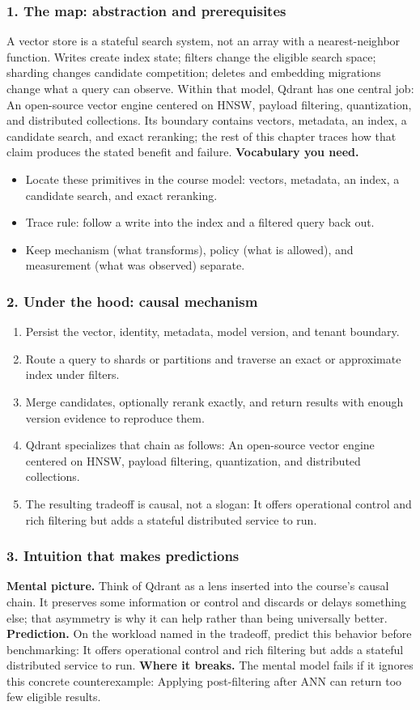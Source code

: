 \subsubsection*{1. The map: abstraction and prerequisites}
A vector store is a stateful search system, not an array with a nearest-neighbor function. Writes create index state; filters change the eligible search space; sharding changes candidate competition; deletes and embedding migrations change what a query can observe.
Within that model, Qdrant has one central job: An open-source vector engine centered on HNSW, payload filtering, quantization, and distributed collections. Its boundary contains vectors, metadata, an index, a candidate search, and exact reranking; the rest of this chapter traces how that claim produces the stated benefit and failure.
\textbf{Vocabulary you need.}\begin{itemize}
\item Locate these primitives in the course model: vectors, metadata, an index, a candidate search, and exact reranking.
\item Trace rule: follow a write into the index and a filtered query back out.
\item Keep mechanism (what transforms), policy (what is allowed), and measurement (what was observed) separate.
\end{itemize}
\subsubsection*{2. Under the hood: causal mechanism}\begin{enumerate}
\item Persist the vector, identity, metadata, model version, and tenant boundary.
\item Route a query to shards or partitions and traverse an exact or approximate index under filters.
\item Merge candidates, optionally rerank exactly, and return results with enough version evidence to reproduce them.
\item Qdrant specializes that chain as follows: An open-source vector engine centered on HNSW, payload filtering, quantization, and distributed collections.
\item The resulting tradeoff is causal, not a slogan: It offers operational control and rich filtering but adds a stateful distributed service to run.
\end{enumerate}
\subsubsection*{3. Intuition that makes predictions}
\textbf{Mental picture.} Think of Qdrant as a lens inserted into the course's causal chain. It preserves some information or control and discards or delays something else; that asymmetry is why it can help rather than being universally better.
\textbf{Prediction.} On the workload named in the tradeoff, predict this behavior before benchmarking: It offers operational control and rich filtering but adds a stateful distributed service to run.
\textbf{Where it breaks.} The mental model fails if it ignores this concrete counterexample: Applying post-filtering after ANN can return too few eligible results.
